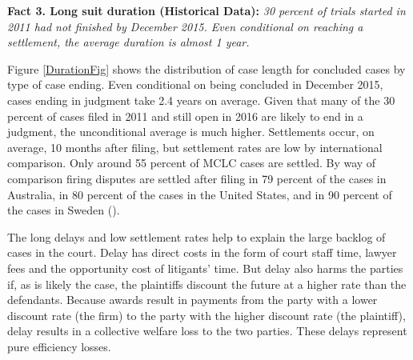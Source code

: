 \documentclass[11pt, a4paper]{article}
\begin{document}

\vspace{.15in}
\textbf{Fact 3. Long suit duration (Historical Data):} \emph{30 percent of trials started in 2011 had not finished by December 2015. Even conditional on reaching a settlement, the average duration is almost 1 year.}
\vspace{.07in}



Figure \ref{DurationFig} shows the distribution of case length for concluded cases by type of case ending. Even conditional on being concluded in December 2015, cases ending in judgment take 2.4 years on average. Given that many of the 30 percent of cases filed in 2011 and still open in 2016 are likely to end in a judgment, the unconditional average is much higher. Settlements occur, on average, 10 months after filing, but settlement rates are low by international comparison. Only around 55 percent of MCLC cases are settled. By way of comparison firing disputes are settled after filing in 79 percent of the cases in Australia, in 80 percent of the cases in the United States, and in 90 percent of the cases in Sweden (\cite{ILO_ComparativeOverview}). 

 
The long delays and low settlement rates help to explain the large backlog of cases in the court. Delay has direct costs in the form of court staff time, lawyer fees and the opportunity cost of litigants' time. But delay also harms the parties if, as is likely the case, the plaintiffs discount the future at a higher rate than the defendants. Because awards result in payments from the party with a lower discount rate (the firm) to the party with the higher discount rate (the plaintiff), delay results in a collective welfare loss to the two parties. These delays represent pure efficiency losses. %
\end{document}
